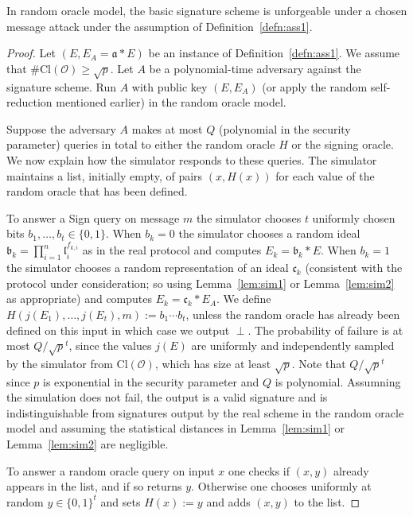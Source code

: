 \documentclass{llncs}
\newcommand{\OO}{\mathcal{O}}
\newcommand{\Cl}{\text{Cl}}
\renewcommand{\a}{\mathfrak{a}}
\renewcommand{\b}{\mathfrak{b}}
\renewcommand{\c}{\mathfrak{c}}
\renewcommand{\l}{\mathfrak{l}}
\begin{document}
\begin{theorem}\label{thm:security}
In random oracle model, the basic signature scheme is unforgeable under a chosen message attack under the assumption of Definition~\ref{defn:ass1}.
\end{theorem}

\begin{proof}
Let $(E, E_A = \a * E )$ be an instance of Definition~\ref{defn:ass1}.
We assume that $\#\Cl(\OO) \ge \sqrt{p}$.
Let $A$ be a polynomial-time adversary against the signature scheme.
Run $A$ with public key $(E, E_A)$ (or apply the random self-reduction mentioned earlier) in the random oracle model.

Suppose the adversary $A$ makes at most $Q$ (polynomial in the security parameter) queries in total to either the random oracle $H$ or the signing oracle. We now explain how the simulator responds to these queries. The simulator maintains a list, initially empty, of pairs $(x, H(x))$ for each value of the random oracle that has been defined.

To answer a Sign query on message $m$ the simulator chooses 
$t$ uniformly chosen bits $b_1, \dots, b_t \in \{0,1\}$.
When $b_k = 0$ the simulator chooses a random ideal $\b_k = \prod_{i=1}^n \l_i^{f_{k,i}}$ as in the real protocol and computes $E_k = \b_k * E$.
When $b_k = 1$ the simulator chooses a random representation of an ideal $\c_k$ (consistent with the protocol under consideration; so using Lemma~\ref{lem:sim1} or Lemma~\ref{lem:sim2} as appropriate) and computes $E_k = \c_k * E_A$.
We define $H( j( E_1), \dots, j(E_t), m ) := b_1 \cdots b_t$, unless the random oracle has already been defined on this input in which case we output $\perp$.
The probability of failure is at most $Q/\sqrt{p}^t$, since the values $j(E)$ are uniformly and independently sampled by the simulator from $\Cl(\OO)$, which has size at least $\sqrt{p}$.
Note that $Q/\sqrt{p}^t$ since $p$ is exponential in the security parameter and $Q$ is polynomial.
Assumning the simulation does not fail, the output is a valid signature and is indistinguishable from signatures output by the real scheme in the random oracle model and assuming the statistical distances in Lemma~\ref{lem:sim1} or Lemma~\ref{lem:sim2} are negligible.

To answer a random oracle query on input $x$ one checks if $(x,y)$ already appears in the list, and if so returns $y$. Otherwise one chooses uniformly at random $y \in \{0,1\}^t$ and sets $H(x) := y$ and adds $(x,y)$ to the list.


\end{proof}
\end{document}
